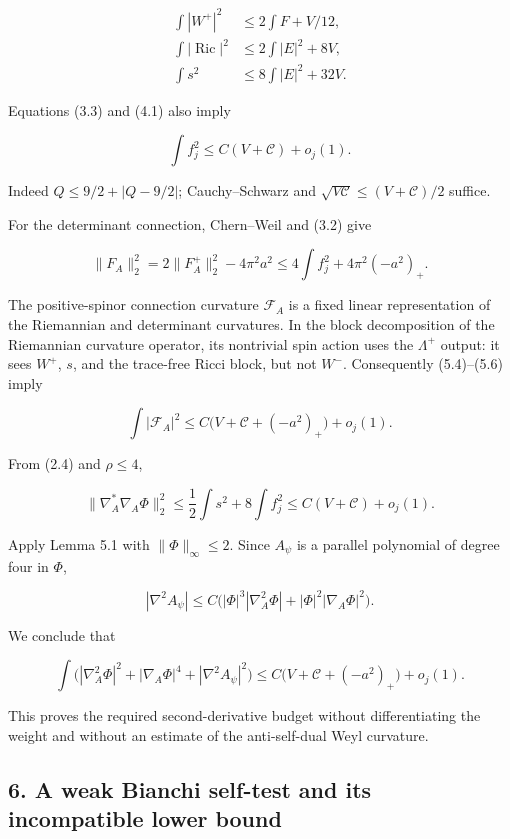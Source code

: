 \documentclass[
  10pt,
]{article}
\begin{document}
\[
 \begin{aligned}
 \int|W^+|^2&\le2\int F+V/12,\\
 \int|\operatorname{Ric}|^2&\le2\int|E|^2+8V,\\
 \int s^2&\le8\int|E|^2+32V.
 \end{aligned}                                              \tag{5.4}
\]

Equations (3.3) and (4.1) also imply

\[
                         \int f_j^2\le C(V+\mathcal C)+o_j(1).
 \tag{5.5}
\]

Indeed \(Q\le9/2+|Q-9/2|\); Cauchy--Schwarz and
\(\sqrt{V\mathcal C}\le(V+\mathcal C)/2\) suffice.

For the determinant connection, Chern--Weil and (3.2) give

\[
 \|F_A\|_2^2
   =2\|F_A^+\|_2^2-4\pi^2a^2
   \le4\int f_j^2+4\pi^2(-a^2)_+.
 \tag{5.6}
\]

The positive-spinor connection curvature \(\mathscr F_A\) is a fixed
linear representation of the Riemannian and determinant curvatures. In
the block decomposition of the Riemannian curvature operator, its
nontrivial spin action uses the \(\Lambda^+\) output: it sees \(W^+\),
\(s\), and the trace-free Ricci block, but not \(W^-\). Consequently
(5.4)--(5.6) imply

\[
             \int|\mathscr F_A|^2
               \le C\bigl(V+\mathcal C+(-a^2)_+\bigr)+o_j(1).
 \tag{5.7}
\]

From (2.4) and \(\rho\le4\),

\[
 \|\nabla_A^*\nabla_A\Phi\|_2^2
       \le\frac12\int s^2+8\int f_j^2
       \le C(V+\mathcal C)+o_j(1).                        \tag{5.8}
\]

Apply Lemma 5.1 with \(\|\Phi\|_\infty\le2\). Since \(A_\psi\) is a
parallel polynomial of degree four in \(\Phi\),

\[
 |\nabla^2A_\psi|
      \le C\bigl(|\Phi|^3|\nabla_A^2\Phi|
                               +|\Phi|^2|\nabla_A\Phi|^2\bigr).
\]

We conclude that

\[
 \int\bigl(|\nabla_A^2\Phi|^2+|\nabla_A\Phi|^4
                                      +|\nabla^2A_\psi|^2\bigr)
       \le C\bigl(V+\mathcal C+(-a^2)_+\bigr)+o_j(1).
 \tag{5.9}
\]

This proves the required second-derivative budget without
differentiating the weight and without an estimate of the anti-self-dual
Weyl curvature.

\hypertarget{a-weak-bianchi-self-test-and-its-incompatible-lower-bound}{%
\subsection{6. A weak Bianchi self-test and its incompatible lower
bound}\label{a-weak-bianchi-self-test-and-its-incompatible-lower-bound}}
\end{document}

